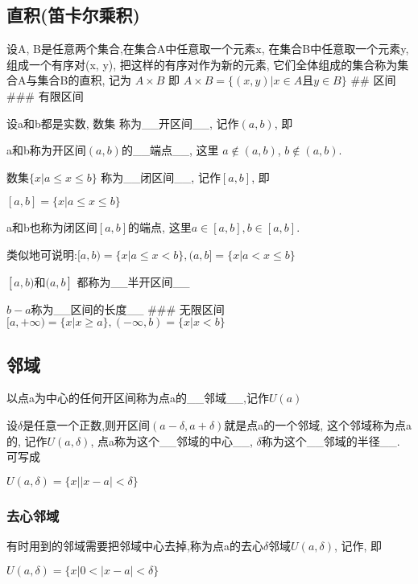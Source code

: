 \documentclass[11pt]{article}
\begin{document}
\subsection{直积(笛卡尔乘积)}\label{ux76f4ux79efux7b1bux5361ux5c14ux4e58ux79ef}

设A, B是任意两个集合,在集合A中任意取一个元素x, 在集合B中任意取一个元素y,
组成一个有序对(x, y), 把这样的有序对作为新的元素,
它们全体组成的集合称为集合A与集合B的直积, 记为 \(A \times B\) 即
\(A \times B=\{(x, y) | x \in A 且 y \in B\}\) \#\# 区间 \#\#\# 有限区间

设a和b都是实数,
数集
称为\_\_开区间\_\_, 记作\((a,b)\), 即


a和b称为开区间\((a,b)\)的\_\_端点\_\_, 这里 \(a \notin (a,b)\),
\(b \notin (a,b)\).

数集\(\{x | a \leqslant x \leqslant b\}\) 称为\_\_闭区间\_\_,
记作\([a,b]\), 即

\([a,b] = \{x|a \leqslant x \leqslant b\}\)

a和b也称为闭区间\([a, b]\)的端点, 这里\(a \in [a, b], b \in [a, b]\).

类似地可说明:\([a, b)=\{x | a \leqslant x<b\} , (a, b]=\{x | a<x \leqslant b\}\)

\([a, b) 和(a, b]\) 都称为\_\_半开区间\_\_

\(b - a\)称为\_\_区间的长度\_\_ \#\#\# 无限区间
\([a,+\infty)=\{x | x \geqslant a\}, (-\infty, b)=\{x | x<b\}\)

\subsection{邻域}\label{ux90bbux57df}

以点a为中心的任何开区间称为点a的\_\_邻域\_\_,记作\(U(a)\)

设\(\delta\)是任意一个正数,则开区间\((a - \delta, a+ \delta)\)就是点a的一个邻域,
这个邻域称为点a的, 记作\(U(a, \delta)\),
点a称为这个\_\_邻域的中心\_\_, \(\delta\)称为这个\_\_邻域的半径\_\_.
可写成

\(U(a, \delta)=\{x||x-a|<\delta \}\)

\subsubsection{去心邻域}\label{ux53bbux5fc3ux90bbux57df}

有时用到的邻域需要把邻域中心去掉,称为点a的去心\(\delta\)邻域\(U(a, \delta)\),
记作, 即

\(U(a, \delta)=\{x| 0<|x-a|<\delta \}\)
\end{document}
